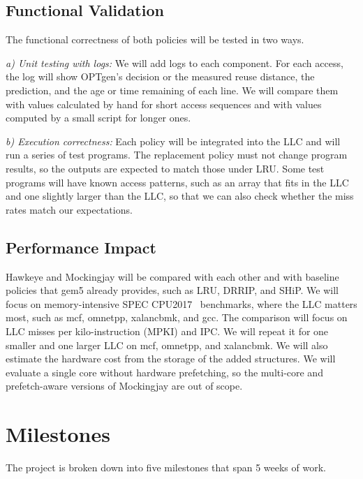 \documentclass[lettersize,journal]{IEEEtran}
\begin{document}
\subsection{Functional Validation}

The functional correctness of both policies will be tested in two ways.

\emph{a) Unit testing with logs:} We will add logs to each component. For each
access, the log will show OPTgen's decision or the measured reuse distance, the
prediction, and the age or time remaining of each line. We will compare them
with values calculated by hand for short access sequences and with values
computed by a small script for longer ones.

\emph{b) Execution correctness:} Each policy will be integrated into the LLC and
will run a series of test programs. The replacement policy must not change
program results, so the outputs are expected to match those under LRU. Some
test programs will have known access patterns, such as an array that fits in
the LLC and one slightly larger than the LLC, so that we can also check whether
the miss rates match our expectations.

\subsection{Performance Impact}

Hawkeye and Mockingjay will be compared with each other and with baseline
policies that gem5 already provides, such as LRU, DRRIP, and SHiP. We will
focus on memory-intensive SPEC CPU2017~\cite{spec17} benchmarks, where the LLC
matters most, such as mcf, omnetpp, xalancbmk, and gcc. The comparison will
focus on LLC misses per kilo-instruction (MPKI) and IPC. We will repeat it for
one smaller and one larger LLC on mcf, omnetpp, and xalancbmk. We will also
estimate the hardware cost from the storage of the added structures. We will
evaluate a single core without hardware prefetching, so the multi-core and
prefetch-aware versions of Mockingjay are out of scope.

\section{Milestones}

The project is broken down into five milestones that span 5 weeks of work.
\end{document}
